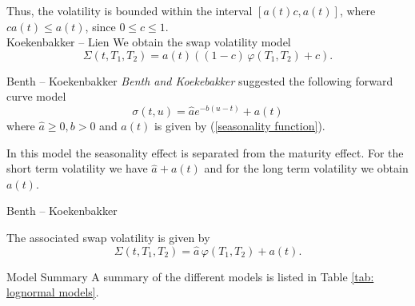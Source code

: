 	Thus, the volatility is bounded within the interval $[a(t)c, a(t)]$, where $ca(t) \le a(t)$, since $0 \le c \le 1$.\\





{Koekenbakker -- Lien}
We obtain the swap volatility model
\begin{equation}
\Sigma(t,T_1,T_2)=a(t) ((1-c)\, \varphi(T_1,T_2)+c).
\end{equation}

{Benth -- Koekenbakker}
\emph{Benth and Koekebakker} suggested the following forward curve model
\begin{equation}
\sigma(t,u)=\hat{a} e^{-b(u-t)}+a(t)
\end{equation}
where $\hat{a} \ge 0, b>0$ and $a(t)$ is given by (\ref{seasonality function}).

In this model the seasonality effect is separated from the maturity effect. For the short term volatility we have $\hat{a}+a(t)$ and for the long term volatility we obtain $a(t)$.

{Benth -- Koekenbakker}

The associated swap volatility is given by
\begin{equation}
\Sigma(t,T_1,T_2)=\hat{a}\, \varphi(T_1,T_2) +a(t).
\end{equation}

{Model Summary}
A summary of the different models  is listed in Table \ref{tab: lognormal models}.
\begin{table}[h]
 \small {}
    \caption[Swap Volatility Models]
    {\small The associated swap volatility models generated by (\ref{eqn: swap volatility creation}) with $a \ge 0, b > 0$ and $0 \le c \le 1$ constants, $a(t)$ defined in (\ref{seasonality function}) and $\varphi(T_1,T_2)$ is given by (\ref{volatility function varphi}). }
    \label{tab: lognormal models}
\end{table}

